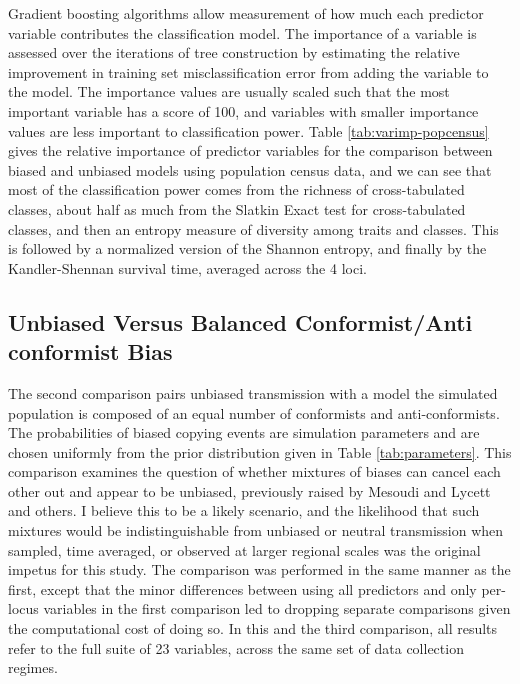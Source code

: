 Gradient boosting algorithms allow measurement of how much each predictor variable contributes the classification model.  The importance of a variable is assessed over the iterations of tree construction by estimating the relative improvement in training set misclassification error from adding the variable to the model.  The importance values are usually scaled such that the most important variable has a score of 100, and variables with smaller importance values are less important to classification power.  Table \ref{tab:varimp-popcensus} gives the relative importance of predictor variables for the comparison between biased and unbiased models using population census data, and we can see that most of the classification power comes from the richness of cross-tabulated classes, about half as much from the Slatkin Exact test for cross-tabulated classes, and then an entropy measure of diversity among traits and classes.  This is followed by a normalized version of the Shannon entropy, and finally by the Kandler-Shennan survival time, averaged across the 4 loci.   

\subsection{Unbiased Versus Balanced Conformist/Anti conformist
Bias}\label{unbiased-versus-mixed-conformistanticonformist-bias}

The second comparison pairs unbiased transmission with a model the simulated population is composed of an equal number of conformists and anti-conformists.  The probabilities of  biased copying events are simulation parameters and are chosen uniformly from the prior distribution given in Table \ref{tab:parameters}.  This comparison examines the question of whether mixtures of biases can cancel each other out and appear to be unbiased, previously raised by Mesoudi and Lycett \cite{Mesoudi2009} and others.  I believe this to be a likely scenario, and the likelihood that such mixtures would be indistinguishable from unbiased or neutral transmission when sampled, time averaged, or observed at larger regional scales was the original impetus for this study.  The comparison was performed in the same manner as the first, except that the minor differences between using all predictors and only per-locus variables in the first comparison led to dropping separate comparisons given the computational cost of doing so.  In this and the third comparison, all results refer to the full suite of 23 variables, across the same set of data collection regimes.  

